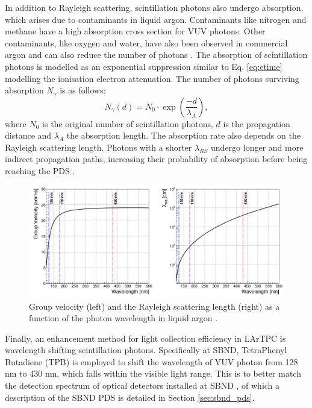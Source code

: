 In addition to Rayleigh scattering, scintillation photons also undergo absorption, which arises due to contaminants in liquid argon.
Contaminants like nitrogen \cite{photon_nitrogen} and methane \cite{photon_methane} have a high absorption cross section for VUV photons.
Other contaminants, like oxygen and water, have also been observed in commercial argon and can also reduce the number of photons \cite{photon_commercial}. 
The absorption of scintillation photons is modelled as an exponential suppression similar to Eq. \ref{eq:etime} modelling the ionisation electron attenuation.
The number of photons surviving absorption $N_\gamma$ is as follows:
\begin{equation}
	N_{\gamma} (d) = N_0 \cdot \exp\left(\frac{-d}{\lambda_{A}}\right),
\label{eq:absorption}
\end{equation}
where $N_0$ is the original number of scintillation photons, $d$ is the propagation distance and $\lambda_A$ the absorption length.
The absorption rate also depends on the Rayleigh scattering length. 
Photons with a shorter $\lambda_{RS}$ undergo longer and more indirect propagation paths, increasing their probability of absorption before being reaching the PDS \cite{PatrickPhD}.


\begin{figure}[b!] 
\centering    
\includegraphics[width=1.0\textwidth]{vuv_visible}
\caption[Group Velocity and Rayleigh Scattering Length of Photons in Liquid Argon]{
Group velocity (left) and the Rayleigh scattering length (right) as a function of the photon wavelength in liquid argon \cite{PatrickPhD}.
}
\label{fig:vuv_visible}
\end{figure}

Finally, an enhancement method for light collection efficiency in LArTPC is wavelength shifting scintillation photons.
Specifically at SBND, TetraPhenyl Butadiene (TPB) is employed to shift the wavelength of VUV photon from 128 nm to 430 nm, which falls within the visible light range.
This is to better match the detection spectrum of optical detectors installed at SBND \cite{sbnd_pds_paper}, of which a description of the SBND PDS is detailed in Section \ref{sec:sbnd_pds}.


